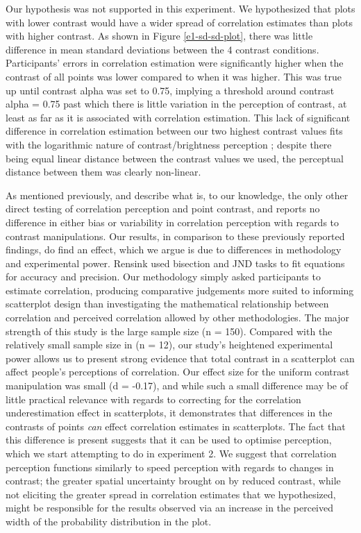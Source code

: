 \documentclass[preprint, 3p,
authoryear]{elsarticle} %
\begin{document}
Our hypothesis was not supported in this experiment. We hypothesized
that plots with lower contrast would have a wider spread of correlation
estimates than plots with higher contrast. As shown in Figure
\ref{e1-sd-sd-plot}, there was little difference in mean standard
deviations between the 4 contrast conditions. Participants' errors in
correlation estimation were significantly higher when the contrast of
all points was lower compared to when it was higher. This was true up
until contrast alpha was set to 0.75, implying a threshold around
contrast alpha = 0.75 past which there is little variation in the
perception of contrast, at least as far as it is associated with
correlation estimation. This lack of significant difference in
correlation estimation between our two highest contrast values fits with
the logarithmic nature of contrast/brightness perception
\citep{varshney_2013, fechner_1948}; despite there being equal linear
distance between the contrast values we used, the perceptual distance
between them was clearly non-linear.

As mentioned previously, \citet{rensink_2012} and \citet{rensink_2014}
describe what is, to our knowledge, the only other direct testing of
correlation perception and point contrast, and reports no difference in
either bias or variability in correlation perception with regards to
contrast manipulations. Our results, in comparison to these previously
reported findings, do find an effect, which we argue is due to
differences in methodology and experimental power. Rensink used
bisection and JND tasks to fit equations for accuracy and precision. Our
methodology simply asked participants to estimate correlation, producing
comparative judgements more suited to informing scatterplot design than
investigating the mathematical relationship between correlation and
perceived correlation allowed by other methodologies. The major strength
of this study is the large sample size (n = 150). Compared with the
relatively small sample size in \citet{rensink_2014} (n = 12), our
study's heightened experimental power allows us to present strong
evidence that total contrast in a scatterplot can affect people's
perceptions of correlation. Our effect size for the uniform contrast
manipulation was small (d = -0.17), and while such a small difference
may be of little practical relevance with regards to correcting for the
correlation underestimation effect in scatterplots, it demonstrates that
differences in the contrasts of points \emph{can} effect correlation
estimates in scatterplots. The fact that this difference is present
suggests that it can be used to optimise perception, which we start
attempting to do in experiment 2. We suggest that correlation perception
functions similarly to speed perception \citep{champion_2017} with
regards to changes in contrast; the greater spatial uncertainty brought
on by reduced contrast, while not eliciting the greater spread in
correlation estimates that we hypothesized, might be responsible for the
results observed via an increase in the perceived width of the
probability distribution in the plot.
\end{document}

